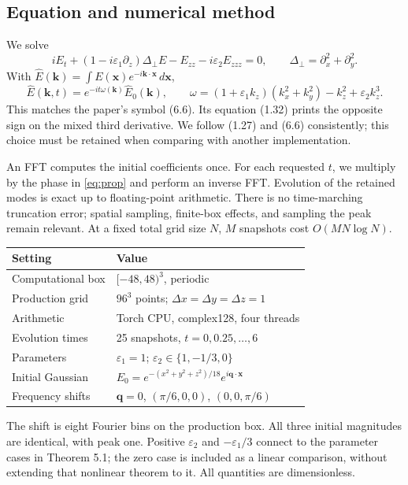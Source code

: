 \documentclass[10pt,letterpaper]{article}
\numberwithin{equation}{section}
\begin{document}
\subsection{Equation and numerical method}\label{optical}
We solve
\begin{equation}
 iE_t+(1-i\varepsilon_1\partial_z)\Delta_\perp E-E_{zz}
       -i\varepsilon_2 E_{zzz}=0,
 \qquad \Delta_\perp=\partial_x^2+\partial_y^2.
 \label{eq:pde}
\end{equation}
With $\widehat E(\mathbf k)=\int E(\mathbf x)e^{-i\mathbf k\cdot\mathbf x}\,d\mathbf x$,
\begin{equation}
 \widehat E(\mathbf k,t)=e^{-it\omega(\mathbf k)}\widehat E_0(\mathbf k),\qquad
 \omega=(1+\varepsilon_1 k_z)(k_x^2+k_y^2)-k_z^2+\varepsilon_2k_z^3.
 \label{eq:prop}
\end{equation}
This matches the paper's symbol (6.6). Its equation (1.32) prints the opposite sign
on the mixed third derivative. We follow (1.27) and (6.6) consistently; this choice
must be retained when comparing with another implementation.

An FFT computes the initial coefficients once. For each requested $t$, we multiply
by the phase in \eqref{eq:prop} and perform an inverse FFT. Evolution of the retained
modes is exact up to floating-point arithmetic. There is no time-marching truncation
error; spatial sampling, finite-box effects, and sampling the peak remain relevant.
At a fixed total grid size $N$, $M$ snapshots cost $O(MN\log N)$.

\begin{center}
\begin{tabular}{ll}\toprule
Setting & Value \\\midrule
Computational box & $[-48,48)^3$, periodic \\
Production grid & $96^3$ points; $\Delta x=\Delta y=\Delta z=1$ \\
Arithmetic & Torch CPU, complex128, four threads \\
Evolution times & 25 snapshots, $t=0,0.25,\ldots,6$ \\
Parameters & $\varepsilon_1=1$; $\varepsilon_2\in\{1,-1/3,0\}$ \\
Initial Gaussian & $E_0=e^{-(x^2+y^2+z^2)/18}e^{i\mathbf q\cdot\mathbf x}$ \\
Frequency shifts & $\mathbf q=0$, $(\pi/6,0,0)$, $(0,0,\pi/6)$ \\\bottomrule
\end{tabular}
\end{center}
The shift is eight Fourier bins on the production box. All three initial magnitudes
are identical, with peak one. Positive $\varepsilon_2$ and $-\varepsilon_1/3$ connect
to the parameter cases in Theorem 5.1; the zero case is included as a linear comparison,
without extending that nonlinear theorem to it. All quantities are dimensionless.
\end{document}

